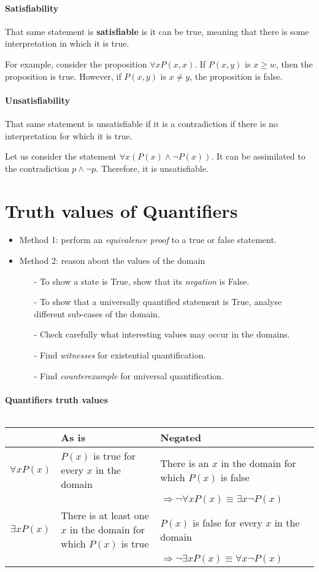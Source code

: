 \documentclass[10pt,a4paper]{book}
\begin{document}
\paragraph*{Satisfiability}
That same statement is \textbf{satisfiable} is it can be true, meaning that there is some interpretation in which it is true.\par 
For example, consider the proposition $\forall x P(x,x)$. If $P(x,y)$ is $x\geq w$, then the proposition is true. However, if $P(x,y)$ is $x\neq y$, the proposition is false.
\paragraph*{Unsatisfiability}
That same statement is unsatisfiable if it is a contradiction if there is no interpretation for which it is true.\par 
Let us consider the statement $\forall x (P(x)\land\neg P(x))$. It can be assimilated to the contradiction $p\land\neg p$. Therefore, it is unsatisfiable.
\section{Truth values of Quantifiers}
\begin{itemize}
\item Method 1: perform an \textit{equivalence proof} to a true or false statement.
\item Method 2: reason about the values of the domain
\begin{itemize}[noitemsep]
	\item[-]To show a state is True, show that its \textit{negation} is False.
	\item[-]To show that a universally quantified statement is True, analyse different sub-cases of the domain.
	\item[-]Check carefully what interesting values may occur in the domains.
	\item[-]Find \textit{witnesses} for existential quantification.
	\item[-]Find \textit{counterexample} for universal quantification.
\end{itemize}
\end{itemize}
\paragraph*{Quantifiers truth values}
$ $\\
$ $\\
\begin{tabularx}{\textwidth}{c |X |X }
 				 & As is & Negated\\
 \hline
 $\forall xP(x)$ & $P(x)$ is true for every $x$ in the domain & There is an $x$ in the domain for which $P(x)$ is false\\
 & & $\Rightarrow\neg\forall xP(x)\equiv\exists x\neg P(x)$\\
 \hline 
 $\exists xP(x)$ & There is at least one $x$ in the domain for which $P(x)$ is true & $P(x)$ is false for every $x$ in the domain\\
  & & $\Rightarrow\neg\exists xP(x)\equiv\forall x\neg P(x)$\\
 \hline
\end{tabularx}
\end{document}
